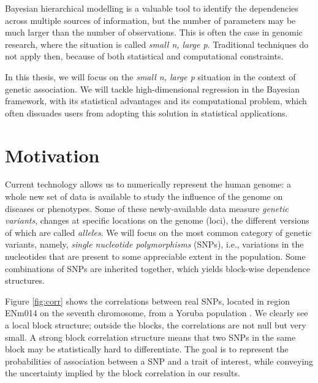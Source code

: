 \documentclass[a4paper, 11pt]{report}
\numberwithin{equation}{chapter}
\begin{document}
Bayesian hierarchical modelling is a valuable tool to identify the dependencies across multiple sources of information, but the number of parameters may be much larger than the number of observations. This is often the case in genomic research, where the situation is called \textit{small n, large p}. Traditional techniques do not apply then, because of both statistical and computational constraints.

In this thesis, we will focus on the \textit{small n, large p} situation in the context of genetic association. We will tackle high-dimensional regression in the Bayesian framework, with its statistical advantages and its computational problem, which often dissuades users from adopting this solution in statistical applications.

\section{Motivation}
Current technology allows us to numerically represent the human genome: a whole new set of data is available to study the influence of the genome on diseases or phenotypes.  Some of these newly-available data measure \textit{genetic variants}, changes at specific locations on  the genome (loci), the different versions of which are called \textit{alleles}. We will focus on the most common category of genetic variants, namely, \textit{single nucleotide polymorphisms} (SNPs), i.e., variations in the nucleotides that are present to some appreciable extent in the population. Some combinations of SNPs are inherited together, which yields block-wise dependence structures.

Figure \ref{fig:corr} shows the correlations between real SNPs, located in region ENm014 on the seventh chromosome, from a Yoruba population \citep[][]{hapmap}. We clearly see a local block structure; outside the blocks, the correlations are not null but very small. A strong block correlation structure means that two SNPs in the same block may be statistically hard to differentiate. The goal is to represent the probabilities of association between a SNP and a trait of interest, while conveying the uncertainty implied by the block correlation in our results.
\end{document}
